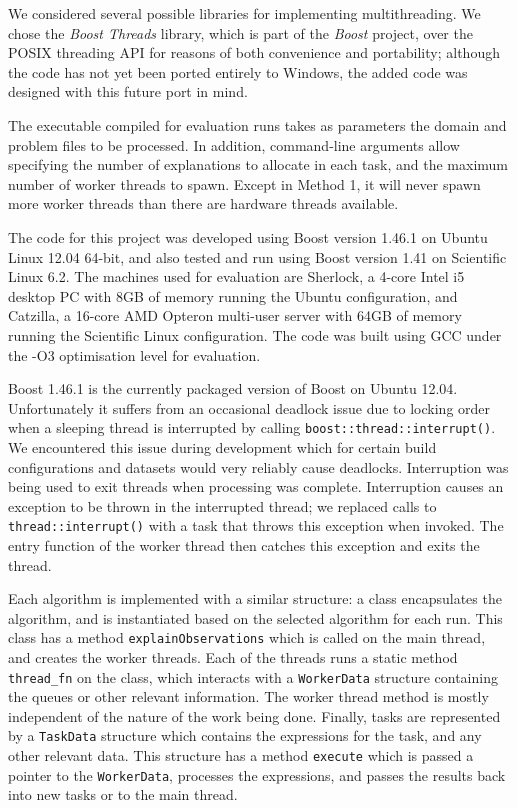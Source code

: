 \documentclass[12pt,twoside,abbrevs,msc,ai,notimes,logo,sansheadings]{infthesis}
\begin{document}
  We considered several possible libraries for implementing multithreading. We chose the \emph{Boost Threads} library, which is part of the \emph{Boost} project, over the POSIX threading API for reasons of both convenience and portability; although the code has not yet been ported entirely to Windows, the added code was designed with this future port in mind.
  
  The executable compiled for evaluation runs takes as parameters the domain and problem files to be processed. In addition, command-line arguments allow specifying the number of explanations to allocate in each task, and the maximum number of worker threads to spawn. Except in Method 1, it will never spawn more worker threads than there are hardware threads available.
  
  The code for this project was developed using Boost version 1.46.1 on Ubuntu Linux 12.04 64-bit, and also tested and run using Boost version 1.41 on Scientific Linux 6.2. The machines used for evaluation are Sherlock, a 4-core Intel i5 desktop PC with 8GB of memory running the Ubuntu configuration, and Catzilla, a 16-core AMD Opteron multi-user server with 64GB of memory running the Scientific Linux configuration. The code was built using GCC under the -O3 optimisation level for evaluation.
  
  Boost 1.46.1 is the currently packaged version of Boost on Ubuntu 12.04. Unfortunately it suffers from an occasional deadlock issue due to locking order when a sleeping thread is interrupted by calling \texttt{boost::thread::interrupt()}. We encountered this issue during development which for certain build configurations and datasets would very reliably cause deadlocks. Interruption was being used to exit threads when processing was complete. Interruption causes an exception to be thrown in the interrupted thread; we replaced calls to \texttt{thread::interrupt()} with a task that throws this exception when invoked. The entry function of the worker thread then catches this exception and exits the thread.
  
  Each algorithm is implemented with a similar structure: a class encapsulates the algorithm, and is instantiated based on the selected algorithm for each run. This class has a method \texttt{explainObservations} which is called on the main thread, and creates the worker threads. Each of the threads runs a static method \texttt{thread\_fn} on the class, which interacts with a \texttt{WorkerData} structure containing the queues or other relevant information. The worker thread method is mostly independent of the nature of the work being done. Finally, tasks are represented by a \texttt{TaskData} structure which contains the expressions for the task, and any other relevant data. This structure has a method \texttt{execute} which is passed a pointer to the \texttt{WorkerData}, processes the expressions, and passes the results back into new tasks or to the main thread.
  
\end{document}
